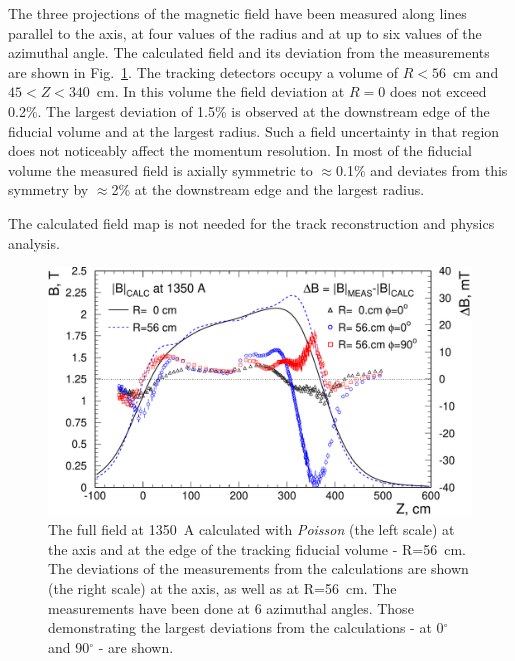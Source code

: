 The three projections of the magnetic field have been measured along lines
parallel to the axis, at four values of the radius and at up to six values
of the azimuthal angle. The calculated field and its deviation from
the measurements are shown in Fig.~\ref{fig:sol:field_comparison}. The
tracking detectors occupy a volume of $R<56$~cm and $45<Z<340$~cm. In
this volume the field deviation at $R=0$ does not exceed 0.2\%. The
largest deviation of 1.5\% is observed at the downstream edge of the
fiducial volume and at the largest radius. Such a field uncertainty in
that region does not noticeably affect the momentum resolution. In
most of the fiducial volume the measured field is axially symmetric to
$\approx$0.1\% and deviates from this symmetry by $\approx$2\% at the
downstream edge and the largest radius.

The calculated field map is not needed for the track reconstruction and
physics analysis.
   

\begin{figure}[!htb]
  \begin{center}
     \includegraphics[angle=0,width=1.0\linewidth]{figures/solenoid_field_calc-meas_comparison_7_1_01}%
  \end{center}
  \caption{
    The full field at 1350~A calculated with {\it Poisson} (the left
    scale) at the axis and at the edge of the tracking fiducial volume
    - R=56~cm. The deviations of the measurements from the
    calculations are shown (the right scale) at the axis, as well as
    at R=56~cm. The measurements have been done at 6 azimuthal
    angles. Those demonstrating the largest deviations from the
    calculations - at 0$^\circ$ and 90$^\circ$ - are shown.  
    \label{fig:sol:field_comparison}
  }
\end{figure}


